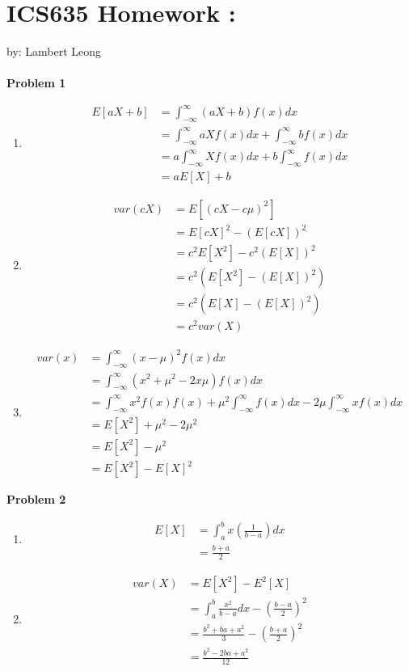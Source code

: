 \documentclass[11pt,letterpaper]{article}
\newcommand{\homework}[2]{
\setcounter{section}{#1}
\section*{ICS635 Homework {\thesection}: {#2} }
{\markboth{#2}{#2}}
}
\begin{document}
\homework{1}{}

by: Lambert Leong\\ \\
\textbf{Problem 1}
\begin{enumerate}[labelindent=0pt]
\item 
	\begin{align*}
	E[aX+b] & = \int_{-\infty}^{\infty}(aX+b)f(x)dx \\
	& = \int_{-\infty}^{\infty}aXf(x)dx+ \int_{-\infty}^{\infty}bf(x)dx \\
	& = a\int_{-\infty}^{\infty} Xf(x)dx+b \int_{-\infty}^{\infty}f(x)dx \\
	& = aE[X]+b
	\end{align*}
\item 
	\begin{align*}
	var(cX) & = E[(cX - c\mu)^2] \\
	& = E[cX]^2 - (E[cX])^2 \\
	& = c^2E[X^2]-c^2(E[X])^2 \\
	& = c^2(E[X^2]-(E[X])^2) \\
	& = c^2(E[X]-(E[X])^2) \\
	& = c^2var(X)
	\end{align*}
\item 
	\begin{align*}
	var(x) & = \int_{-\infty}^{\infty}(x-\mu)^2f(x)dx \\
	& = \int_{-\infty}^{\infty}(x^2+\mu^2-2x\mu)f(x)dx \\
	& = \int_{-\infty}^{\infty}x^2f(x)f(x)+\mu^2 \int_{-\infty}^{\infty}f(x)dx-2\mu \int_{-\infty}^{\infty}xf(x)dx \\
	& = E[X^2]+\mu^2-2\mu^2 \\
	& = E[X^2]-\mu^2 \\
	& = E[X^2]-E[X]^2
	\end{align*}
\end{enumerate}

\noindent
\textbf{Problem 2}
\begin{enumerate}[labelindent=0pt]
\item 
	\begin{align*}
	E[X]  & = \int_{a}^{b}x(\tfrac{1}{b-a})dx \\
	      & = \tfrac{b+a}{2}
	\end{align*}
\item
	\begin{align*}
	var(X) & = E[X^2]-E^2[X] \\
	& = \int_{a}^{b}\tfrac{x^2}{b-a}dx-(\tfrac{b-a}{2})^2 \\
	& = \frac{b^2+ba+a^2}{3} - (\tfrac{b+a}{2})^2 \\
	& = \frac{b^2-2ba+a^2}{12}
	\end{align*}
\end{enumerate}
\end{document}
